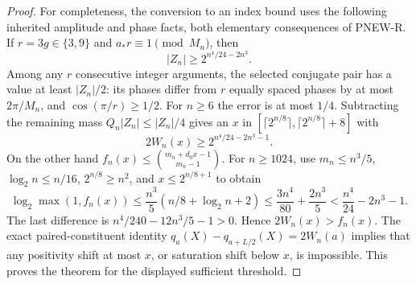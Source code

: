 \begin{proof}
For completeness, the conversion to an index bound uses the
following inherited amplitude and phase facts, both elementary
consequences of PNEW-R.  If $r=3g\in\{3,9\}$ and
$a_*r\equiv1\pmod{M_n}$, then
\[
 |Z_n|\ge2^{n^4/24-2n^3}.
\]
Among any $r$ consecutive integer arguments, the selected
conjugate pair has a value at least $|Z_n|/2$: its phases differ
from $r$ equally spaced phases by at most $2\pi/M_n$, and
$\cos(\pi/r)\ge1/2$.  For $n\ge6$ the error is at most
$1/4$.  Subtracting the remaining mass $Q_n|Z_n|\le|Z_n|/4$
gives an $x$ in
$[\lceil2^{n/8}\rceil,\lceil2^{n/8}\rceil+8]$ with
\[
                    2W_n(x)\ge2^{n^4/24-2n^3-1}.
\]
On the other hand
$f_n(x)\le\binom{m_n+d_0x-1}{m_n-1}$.
For $n\ge1024$, use $m_n\le n^3/5$,
$\log_2n\le n/16$, $2^{n/8}\ge n^2$, and
$x\le2^{n/8+1}$ to obtain
\[
 \log_2\max(1,f_n(x))
 \le\frac{n^3}{5}(n/8+\log_2n+2)
 \le\frac{3n^4}{80}+\frac{2n^3}{5}
                  <\frac{n^4}{24}-2n^3-1.
\]
The last difference is $n^4/240-12n^3/5-1>0$.
Hence $2W_n(x)>f_n(x)$.  The exact paired-constituent identity
$q_a(X)-q_{a+L/2}(X)=2W_n(a)$ implies that any positivity shift
at most $x$, or saturation shift below $x$, is impossible.
This proves the theorem for the displayed sufficient threshold.
\end{proof}
